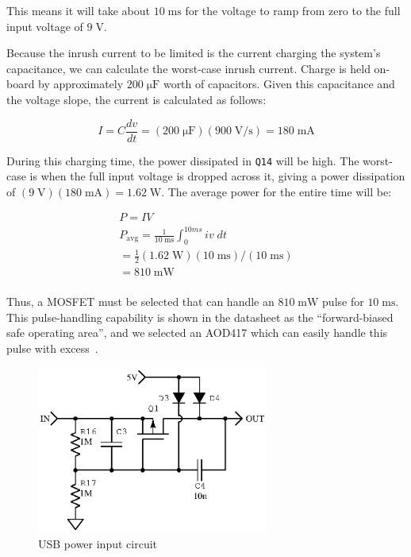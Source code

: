 \documentclass[article,oneside]{memoir}
\newcommand{\mr}[1]{\ensuremath{\mathrm{#1}}}
\begin{document}
\begin{multicols}{2}
This means it will take about $10\;\mr{ms}$ for the voltage to ramp from zero
to the full input voltage of $9\;\mr{V}$.

Because the inrush current to be limited is the current charging the system's
capacitance, we can calculate the worst-case inrush current. Charge is held
on-board by approximately $200\;\mr{\mu F}$ worth of capacitors. Given this
capacitance and the voltage slope, the current is calculated as follows:

\begin{equation*}
    I = C \frac{dv}{dt} = (200\;\mr{\mu F})(900\;\mr{V/s}) = 180\;\mr{mA}
\end{equation*}

During this charging time, the power dissipated in \texttt{Q14} will be high.
The worst-case is when the full input voltage is dropped across it, giving
a power dissipation of $(9\;\mr{V})(180\;\mr{mA}) = 1.62\;\mr{W}$. The average
power for the entire time will be:

\begin{gather*}
    P = IV \\
    P_\mr{avg} = \frac{1}{10\;\mr{ms}}\int_0^{10ms} iv\;dt \\
    {}= \tfrac{1}{2}(1.62\;\mr{W})(10\;\mr{ms})/(10\;\mr{ms}) \\
    {}= 810\;\mr{mW} \\
\end{gather*}

Thus, a MOSFET must be selected that can handle an $810\;\mr{mW}$ pulse for
$10\;\mr{ms}$. This pulse-handling capability is shown in the datasheet as
the ``forward-biased safe operating area'', and we selected an AOD417 which
can easily handle this pulse with excess~\cite{aod417}.

\begin{figure}[H]
\centering
\includegraphics[width=3in]{usbinput}
\caption{USB power input circuit}
\label{fig:usbpower}
\end{figure}


\end{multicols}
\end{document}
